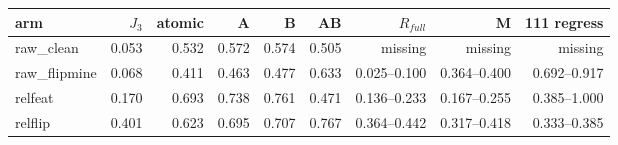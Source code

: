 \begin{tabular}{@{}lrrrrrrrr@{}}
\toprule
arm & $J_3$ & atomic & A & B & AB & $R_{full}$ & M & 111 regress\\
\midrule
raw_clean & 0.053 & 0.532 & 0.572 & 0.574 & 0.505 & missing & missing & missing \\
raw_flipmine & 0.068 & 0.411 & 0.463 & 0.477 & 0.633 & 0.025--0.100 & 0.364--0.400 & 0.692--0.917 \\
relfeat & 0.170 & 0.693 & 0.738 & 0.761 & 0.471 & 0.136--0.233 & 0.167--0.255 & 0.385--1.000 \\
relflip & 0.401 & 0.623 & 0.695 & 0.707 & 0.767 & 0.364--0.442 & 0.317--0.418 & 0.333--0.385 \\
\bottomrule
\end{tabular}
